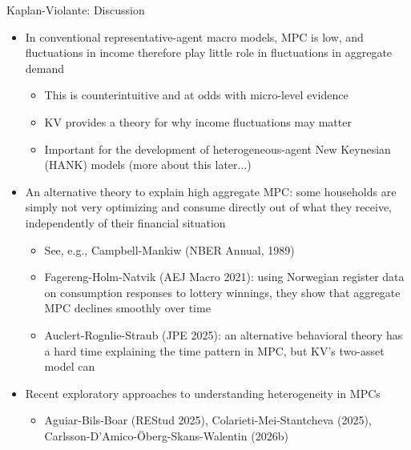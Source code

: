 \documentclass[9pt]{beamer}
\newcommand{\bit}{\begin{itemize}}
\newcommand{\eit}{\end{itemize}}
\begin{document}
\begin{frame}{Kaplan-Violante: Discussion}

\bit
\setlength\itemsep{1em}
\item In conventional representative-agent macro models, MPC is low, and fluctuations in income therefore play little role in fluctuations in aggregate demand
\bit
\setlength\itemsep{0.5em}
	\item This is counterintuitive and at odds with micro-level evidence

	\item KV provides a theory for why income fluctuations may matter

	\item Important for the development of heterogeneous-agent New Keynesian (HANK) models (more about this later...)
\eit

\item An alternative theory to explain high aggregate MPC: some households are simply not very optimizing and consume directly out of what they receive, independently of their financial situation
\bit
\setlength\itemsep{0.5em}
	\item See, e.g., Campbell-Mankiw (NBER Annual, 1989)
	
	\item Fagereng-Holm-Natvik (AEJ Macro 2021): using Norwegian register data on consumption responses to lottery winnings, they show that aggregate MPC declines smoothly over time
	
	\item Auclert-Rognlie-Straub (JPE 2025): an alternative behavioral theory has a hard time explaining the time pattern in MPC, but KV's two-asset model can 
\eit

\item Recent exploratory approaches to understanding heterogeneity in MPCs 
\bit
	\item Aguiar-Bils-Boar (REStud 2025), Colarieti-Mei-Stantcheva (2025), Carlsson-D'Amico-{\"O}berg-Skans-Walentin (2026b)
\eit
\eit

\end{frame}
\end{document}
